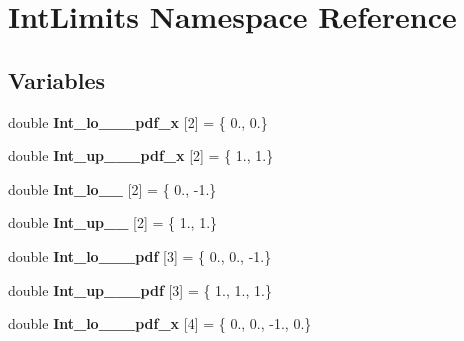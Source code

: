 \hypertarget{namespaceIntLimits}{}\section{Int\+Limits Namespace Reference}
\label{namespaceIntLimits}
\subsection*{Variables}
\begin{DoxyCompactItemize}
\item 
\hypertarget{namespaceIntLimits_afb5256e0acbcc4a075b95c9c79ed3be7}{}double {\bfseries Int\+\_\+lo\+\_\+\_\+\_\+pdf\+\_\+x} \mbox{[}2\mbox{]} = \{ 0., 0.\}\label{namespaceIntLimits_afb5256e0acbcc4a075b95c9c79ed3be7}

\item 
\hypertarget{namespaceIntLimits_a88f13c3711e3d995a311b3b63ee427b8}{}double {\bfseries Int\+\_\+up\+\_\+\_\+\_\+pdf\+\_\+x} \mbox{[}2\mbox{]} = \{ 1., 1.\}\label{namespaceIntLimits_a88f13c3711e3d995a311b3b63ee427b8}

\item 
\hypertarget{namespaceIntLimits_abea5d83ca81d125c3bfe744f15dde530}{}double {\bfseries Int\+\_\+lo\+\_\+\_} \mbox{[}2\mbox{]} = \{ 0., -\/1.\}\label{namespaceIntLimits_abea5d83ca81d125c3bfe744f15dde530}

\item 
\hypertarget{namespaceIntLimits_af96e60fc225282d80606ca70991b8068}{}double {\bfseries Int\+\_\+up\+\_\+\_} \mbox{[}2\mbox{]} = \{ 1., 1.\}\label{namespaceIntLimits_af96e60fc225282d80606ca70991b8068}

\item 
\hypertarget{namespaceIntLimits_abcc37e434e81507b78bdcde1745131b7}{}double {\bfseries Int\+\_\+lo\+\_\+\_\+\_\+pdf} \mbox{[}3\mbox{]} = \{ 0., 0., -\/1.\}\label{namespaceIntLimits_abcc37e434e81507b78bdcde1745131b7}

\item 
\hypertarget{namespaceIntLimits_a1214aaf3a96dc285a487625dfd6393c6}{}double {\bfseries Int\+\_\+up\+\_\+\_\+\_\+pdf} \mbox{[}3\mbox{]} = \{ 1., 1., 1.\}\label{namespaceIntLimits_a1214aaf3a96dc285a487625dfd6393c6}

\item 
\hypertarget{namespaceIntLimits_a4fdb20b301099bd283171972017c065f}{}double {\bfseries Int\+\_\+lo\+\_\+\_\+\_\+pdf\+\_\+x} \mbox{[}4\mbox{]} = \{ 0., 0., -\/1., 0.\}\label{namespaceIntLimits_a4fdb20b301099bd283171972017c065f}


\end{DoxyCompactItemize}
